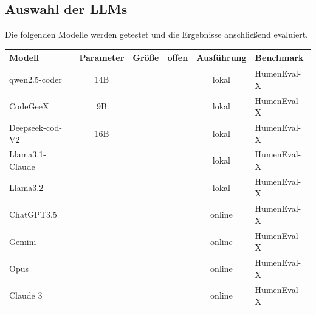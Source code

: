 

\subsection{Auswahl der LLMs}
Die folgenden Modelle werden getestet und die Ergebnisse anschließend evaluiert.
\begin{table}
	\begin{tabular}{|l|c|c|c|c|l|}
		\hline
		\textbf{Modell} & \textbf{Parameter} & \textbf{Größe} & \textbf{offen} & \textbf{Ausführung}  & \textbf{Benchmark} \\
		\hline
		qwen2.5-coder   & 14B & & & lokal & HumenEval-X \\
		CodeGeeX        & 9B  & & & lokal & HumenEval-X \\
		Deepseek-cod-V2 & 16B & & & lokal & HumenEval-X \\
		Llama3.1-Claude & & & & lokal & HumenEval-X \\
		Llama3.2        & & & & lokal & HumenEval-X \\
		ChatGPT3.5      & & & & online & HumenEval-X \\
		Gemini          & & & & online & HumenEval-X \\
		Opus            & & & & online & HumenEval-X \\
		Claude 3        & & & & online & HumenEval-X \\
		\hline
	\end{tabular}
\end{table}


	
	

